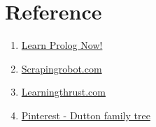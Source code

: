 \section{Reference}
\begin{enumerate}
    \item \href{https://lpn.swi-prolog.org/lpnpage.php?pageid=online}{Learn Prolog Now!} 
    \item \href{https://scrapingrobot.com/blog/programming-language-prolog/}{Scrapingrobot.com}
    \item \href{https://www.learningthrust.com/ai/prolog-features}{Learningthrust.com}
    \item \href{https://www.pinterest.com/pin/5207355813501511/}{Pinterest - Dutton family tree}
\end{enumerate}